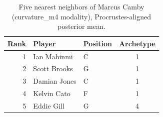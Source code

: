 \begin{table}[htbp]
  \centering\small
  \begin{tabular}{rllc}
    \toprule
    Rank & Player & Position & Archetype \\
    \midrule
    1 & Ian Mahinmi & C & 1 \\
    2 & Scott Brooks & G & 1 \\
    3 & Damian Jones & C & 1 \\
    4 & Kelvin Cato & F & 1 \\
    5 & Eddie Gill & G & 4 \\
    \bottomrule
  \end{tabular}
  \caption{Five nearest neighbors of Marcus Camby (curvature_m4 modality), Procrustes-aligned posterior mean.}
  \label{tab:Marcus_Camby_neighbors_curvature_m4}
\end{table}

